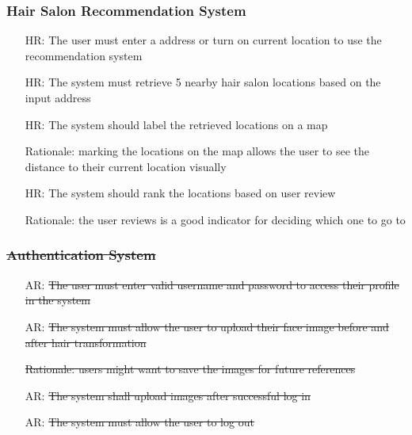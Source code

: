 \documentclass[12pt]{article}
\newcounter{reqnum} %
\newcounter{arreqnum} %
\newcounter{hrreqnum} %
\begin{document}
\subsubsection{Hair Salon Recommendation System}
    \begin{itemize}
        \item[HR\refstepcounter{hrreqnum}\thehrreqnum \label{R_Inputs}:] The user must enter a address or turn on current location to use the recommendation system
        \item[HR\refstepcounter{hrreqnum}\thehrreqnum \label{R_Inputs}:] The system must retrieve 5 nearby hair salon locations based on the input address
        \item[HR\refstepcounter{hrreqnum}\thehrreqnum \label{R_Inputs}:] The system should label the retrieved locations on a map
        \item[] Rationale: marking the locations on the map allows the user to see the distance to their current location visually
        \item[HR\refstepcounter{hrreqnum}\thehrreqnum \label{R_Inputs}:] The system should rank the locations based on user review
        \item[] Rationale: the user reviews is a good indicator for deciding which one to go to
    \end{itemize}
    
\subsubsection{\sout{Authentication System}}
    \begin{itemize}
        \item[AR\refstepcounter{arreqnum}\thearreqnum \label{R_Inputs}:] \sout{The user must enter valid username and password to access their profile in the system}
        \item[AR\refstepcounter{arreqnum}\thearreqnum \label{R_Inputs}:] \sout{The system must allow the user to upload their face image before and after hair transformation}
        \item[] \sout{Rationale: users might want to save the images for future references}
        \item[AR\refstepcounter{arreqnum}\thearreqnum \label{R_Inputs}:] \sout{The system shall upload images after successful log in}
        \item[AR\refstepcounter{arreqnum}\thearreqnum \label{R_Inputs}:] \sout{The system must allow the user to log out}
    \end{itemize}
\end{document}
